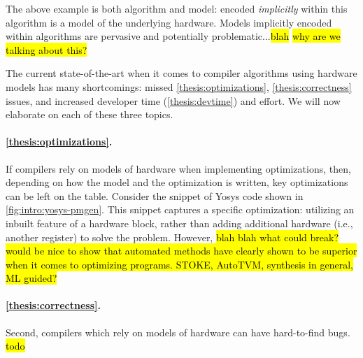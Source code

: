 

\noindent
The above example is both algorithm
  and model:
  encoded \textit{implicitly}
  within this algorithm
  is a model of the underlying hardware.
Models implicitly encoded within algorithms
  are pervasive and potentially problematic...\hl{blah}
\hl{why are we talking about this?}
  

The current state-of-the-art
  when it comes to compiler algorithms
  using hardware models
  has many shortcomings:
  missed
  \cref{thesis:optimizations},
  \cref{thesis:correctness}
  issues,
  and 
  increased developer time
  (\cref{thesis:devtime})
  and effort.
We will now
  elaborate on each of these three topics.

\paragraph{\cref{thesis:optimizations}.}
If compilers rely on models
  of hardware
  when implementing optimizations,
  then, depending on how the model
  and the optimization is written,
  key optimizations can be left on the table.
Consider the snippet of Yosys code
  shown in
  \cref{fig:intro:yosys-pmgen}.
This snippet captures a specific optimization:
  utilizing an inbuilt feature of a hardware block,
  rather than adding additional hardware
  (i.e., another register) to solve the problem.
However,
  \hl{blah blah what could break?}
\hl{would be nice to show that automated methods have clearly shown
  to be superior when it comes to optimizing programs.
  STOKE, AutoTVM, synthesis in general, ML guided?}

\paragraph{\cref{thesis:correctness}.}
Second, compilers
  which rely on models of hardware
  can have hard-to-find bugs.
\hl{todo}

